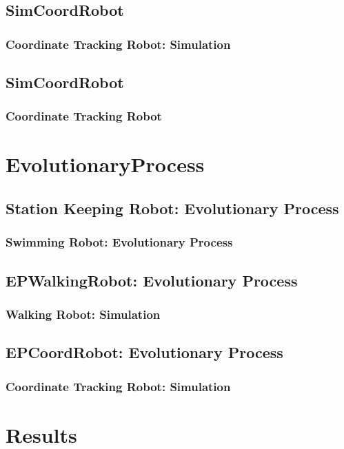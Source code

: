 \documentclass{beamer}
\begin{document}
\subsection{SimCoordRobot}
\begin{frame}
  \frametitle{Coordinate Tracking Robot: Simulation}

\end{frame}

\subsection{SimCoordRobot}
\begin{frame}
  \frametitle{Coordinate Tracking Robot}
\end{frame}

\section{EvolutionaryProcess}

\subsection{Station Keeping Robot: Evolutionary Process}
\begin{frame}
  \frametitle{Swimming Robot: Evolutionary Process}
\end{frame}

\subsection{EPWalkingRobot: Evolutionary Process}
\begin{frame}
  \frametitle{Walking Robot: Simulation}
\end{frame}

\subsection{EPCoordRobot: Evolutionary Process}
\begin{frame}
  \frametitle{Coordinate Tracking Robot: Simulation}
\end{frame}

\section{Results}
\end{document}
